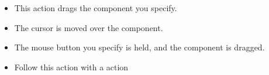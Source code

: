 
\begin{itemize}
\item This action drags the component you specify.
\item The cursor is moved over the component.
\item The mouse button you specify is held, and the component is dragged. 
\item Follow this action with a  action
\end{itemize}
